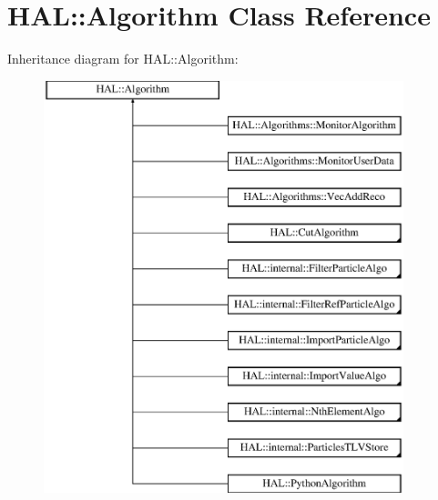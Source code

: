 \hypertarget{class_h_a_l_1_1_algorithm}{\section{H\-A\-L\-:\-:Algorithm Class Reference}
\label{class_h_a_l_1_1_algorithm}
}
Inheritance diagram for H\-A\-L\-:\-:Algorithm\-:\begin{figure}[H]
\begin{center}
\leavevmode
\includegraphics[height=12.000000cm]{class_h_a_l_1_1_algorithm}
\end{center}
\end{figure}
